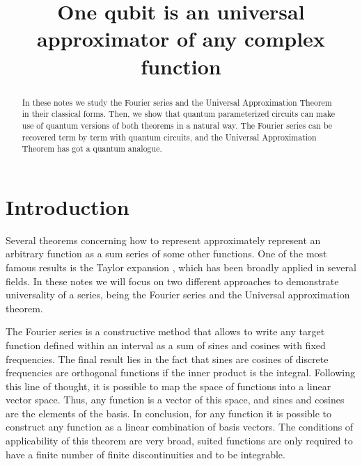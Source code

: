 \documentclass[aps,amssymb,amsmath,amsfonts,pra,superscriptaddress,onecolumn]{revtex4}
\begin{document}
\title{One qubit is an universal approximator of any complex function}

\begin{abstract}
In these notes we study the Fourier series and the Universal Approximation Theorem in their classical forms. Then, we show that quantum parameterized circuits can make use of quantum versions of both theorems in a natural way. The Fourier series can be recovered term by term with quantum circuits, and the Universal Approximation Theorem has got a quantum analogue.
\end{abstract}
\maketitle

\section{Introduction}
Several theorems concerning how to represent approximately represent an arbitrary function as a sum series of some other functions. One of the most famous results is the Taylor expansion \cite{maths-arfken1999}, which has been broadly applied in several fields. In these notes we will focus on two different approaches to demonstrate universality of a series, being the Fourier series and the Universal approximation theorem. 

The Fourier series is a constructive method that allows to write any target function defined within an interval as a sum of sines and cosines with fixed frequencies. The final result lies in the fact that sines are cosines of discrete frequencies are orthogonal functions if the inner product is the integral. Following this line of thought, it is possible to map the space of functions into a linear vector space. Thus, any function is a vector of this space, and sines and cosines are the elements of the basis. In conclusion, for any function it is possible to construct any function as a linear combination of basis vectors. The conditions of applicability of this theorem are very broad, suited functions are only required to have a finite number of finite discontinuities and to be integrable. 
\end{document}
